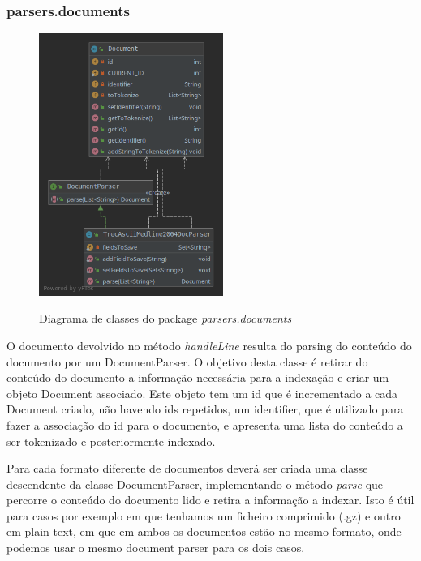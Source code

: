 \documentclass[12pt]{article}
\begin{document}
\subsubsection{parsers.documents}
\begin{figure}[h]
  \center
  \includegraphics[width=6cm]{packages_parsers_documents.png}
  \label{fig:packages_parsers_documents}
  \caption{Diagrama de classes do package \it parsers.documents}
\end{figure}

O documento devolvido no método {\it handleLine} resulta do parsing do conteúdo do
documento por um DocumentParser. O objetivo desta classe é retirar do conteúdo do documento
a informação necessária para a indexação e criar um objeto Document associado. Este objeto
tem um id que é incrementado a cada Document criado, não havendo ids repetidos, um identifier,
que é utilizado para fazer a associação do id para o documento, e apresenta uma lista do
conteúdo a ser tokenizado e posteriormente indexado.

Para cada formato diferente de documentos deverá ser criada uma classe descendente da classe
DocumentParser, implementando o método {\it parse} que percorre o conteúdo do documento
lido e retira a informação a indexar. Isto é útil para casos por exemplo em que tenhamos um
ficheiro comprimido (.gz) e outro em plain text, em que em ambos os documentos estão no
mesmo formato, onde podemos usar o mesmo document parser para os dois casos.
\end{document}
